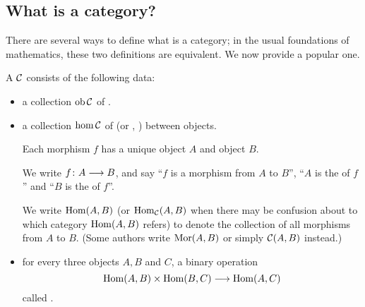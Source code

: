 \subsection{What is a category?}
  There are several ways to define what is a category; in the usual foundations of mathematics, these two definitions are equivalent. We now provide a popular one.
  \begin{defn}\label{def:category}
  A  ${\cal C}$ consists of the following data:
  \begin{itemize}
    \item a collection $\operatorname{ob}{\cal C}$ of .
    \item a collection $\hom{\cal C}$ of  (or , ) between objects.

             Each morphism $f$ has a unique  object $A$ and  object $B$.

             We write $f\colon A\longrightarrow B$, and say ``$f$ is a morphism from $A$ to $B$'', ``$A$ is the  of $f$'' and ``$B$ is the  of $f$''.

             We write $\operatorname{Hom}(A, B)$ (or $\operatorname{Hom}_{{\cal C}}(A, B)$ when there may be confusion about to which category $\operatorname{Hom}(A, B)$ refers) to denote the collection of all morphisms from $A$ to $B$. (Some authors write $\operatorname{Mor}(A, B)$ or simply ${\cal C}(A,B)$ instead.)
    \item for every three objects $A,B$ and $C$, a binary operation
             \begin{equation*}
               \operatorname{Hom}(A, B) \times \operatorname{Hom}(B, C) \longrightarrow \operatorname{Hom}(A, C)
             \end{equation*}
             called .


\end{itemize}
\end{defn}
